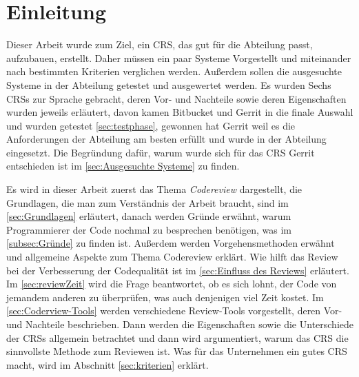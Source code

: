 \newpage

\section{Einleitung}
\label{sec:Einleitung}

Dieser Arbeit wurde zum Ziel, ein \ac{CRS}, das gut für die Abteilung passt, aufzubauen, erstellt. Daher müssen ein paar Systeme Vorgestellt und miteinander nach bestimmten Kriterien verglichen werden. Außerdem sollen die ausgesuchte Systeme in der Abteilung getestet und ausgewertet werden.
Es wurden Sechs \acp{CRS} zur Sprache gebracht, deren Vor- und Nachteile sowie deren Eigenschaften wurden jeweils erläutert, davon kamen Bitbucket und Gerrit in die finale Auswahl und wurden getestet \cref{sec:testphase}, gewonnen hat Gerrit weil es die Anforderungen der Abteilung am besten erfüllt und wurde in der Abteilung eingesetzt. Die Begründung dafür, warum wurde sich für das \ac{CRS} Gerrit entschieden ist im \cref{sec:Ausgesuchte Systeme} zu finden.

Es wird in dieser Arbeit zuerst das Thema \emph{Codereview} dargestellt, die Grundlagen, die man zum Verständnis der Arbeit braucht, sind im \cref{sec:Grundlagen} erläutert, danach werden Gründe erwähnt, warum Programmierer der Code nochmal zu besprechen benötigen, was im \cref{subsec:Gründe} zu finden ist. Außerdem werden Vorgehensmethoden erwähnt und allgemeine Aspekte zum Thema Codereview erklärt. Wie hilft das Review bei der Verbesserung der Codequalität ist im \cref{sec:Einfluss des Reviews} erläutert. Im \cref{sec:reviewZeit} wird die Frage beantwortet, ob es sich lohnt, der Code von jemandem anderen zu überprüfen, was auch denjenigen viel Zeit kostet.
Im \cref{sec:Coderview-Tools} werden verschiedene Review-Tools vorgestellt, deren Vor- und Nachteile beschrieben. Dann werden die Eigenschaften sowie die Unterschiede der \acp{CRS} allgemein betrachtet und dann wird argumentiert, warum das \ac{CRS} die sinnvollste Methode zum Reviewen ist. Was für das Unternehmen ein gutes \ac{CRS} macht, wird im Abschnitt \ref{sec:kriterien} erklärt.